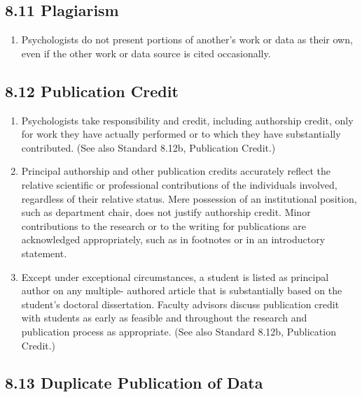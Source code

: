 \subsection{8.11 Plagiarism}

\begin{enumerate}

\item Psychologists do not present portions of another's work or data as their own, even if the other work or data
source is cited occasionally.

\end{enumerate}


\subsection{8.12 Publication Credit}


\begin{enumerate}

\item Psychologists take responsibility and credit, including authorship credit, only for work they have actually performed or to which they have substantially contributed. (See also Standard 8.12b, Publication Credit.)


\item Principal authorship and other publication credits accurately reflect the relative scientific or professional contributions of the individuals involved, regardless of their relative status. Mere possession of an institutional position, such as department chair, does not justify authorship credit. Minor contributions to the research or to the writing for publications are acknowledged appropriately, such as in footnotes or in an introductory statement.


\item Except under exceptional circumstances, a student is listed as principal author on any multiple- authored article that is substantially based on the student's doctoral dissertation. Faculty advisors discuss publication credit with students as early as feasible and throughout the research and publication process as appropriate. (See also Standard 8.12b, Publication Credit.)

\end{enumerate}


\subsection{8.13 Duplicate Publication of Data}



